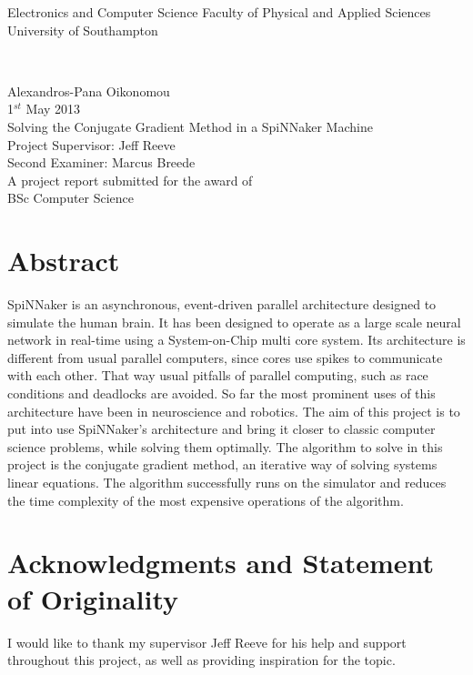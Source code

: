 \documentclass[12pt,a4paper]{article}
\author{Alexandros-Panagiotis Oikonomou}
\begin{document}
\begin{titlepage}
\begin{center}
\begin{LARGE}
Electronics and Computer Science
Faculty of Physical and Applied Sciences
University of Southampton 
\end{LARGE}
\\[2cm]
\begin{large}
Alexandros-Pana Oikonomou
\\
1$^{st}$ May 2013
\\[2cm]
Solving the Conjugate Gradient Method in a SpiNNaker Machine
\\[3.5cm]
Project Supervisor: Jeff Reeve
\\Second Examiner: Marcus Breede
\\[3.5cm]
A project report submitted for the award of
\\BSc Computer Science
\end{large}
\end{center}
\end{titlepage}
\section*{Abstract}
SpiNNaker is an asynchronous, event-driven parallel architecture designed to simulate
the human brain. It has been designed to operate as a large scale neural network in
real-time using a System-on-Chip multi core system. Its architecture is different from
usual parallel computers, since cores use spikes to communicate with each other. That
way usual pitfalls of parallel computing, such as race conditions and deadlocks are
avoided. So far the most prominent uses of this architecture have been in
neuroscience and robotics. The aim of this project is to put into use SpiNNaker's
architecture and bring it closer to classic computer science problems, while solving
them optimally. The algorithm to solve in this project is the conjugate gradient
method, an iterative way of solving systems linear equations. The algorithm successfully runs on the simulator and reduces the time complexity of the most expensive operations of the algorithm.
\newpage
\tableofcontents
\newpage
\section*{Acknowledgments and Statement of Originality}
I would like to thank my supervisor Jeff Reeve for his help and support throughout this project, as well as providing inspiration for the topic.
\newpage
\end{document}
